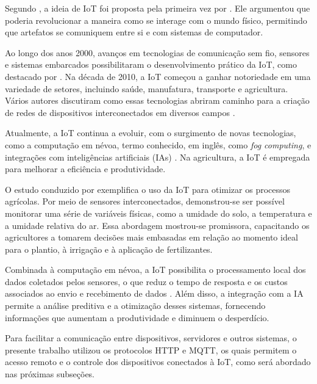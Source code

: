 Segundo \textcite{minerva2015towards}, a ideia de IoT foi proposta pela primeira vez por \textcite{ashton1999things}. Ele argumentou que poderia revolucionar a maneira como se interage com o mundo físico, permitindo que artefatos se comuniquem entre si e com sistemas de computador.

Ao longo dos anos 2000, avanços em tecnologias de comunicação sem fio, sensores e sistemas embarcados possibilitaram o desenvolvimento prático da IoT, como destacado por \textcite{kortuem2009things}. Na década de 2010, a IoT começou a ganhar notoriedade em uma variedade de setores, incluindo saúde, manufatura, transporte e agricultura. Vários autores discutiram como essas tecnologias abriram caminho para a criação de redes de dispositivos interconectados em diversos campos \parencite{kortuem2009things, tan2010things, minerva2015towards}.

Atualmente, a IoT continua a evoluir, com o surgimento de novas tecnologias, como a computação em névoa, termo conhecido, em inglês, como \textit{fog computing}, e integrações com inteligências artificiais (IAs) \parencite{junior2022data}. Na agricultura, a IoT é empregada para melhorar a eficiência e produtividade.

O estudo conduzido por \textcite{ferrandez2018precision} exemplifica o uso da IoT para otimizar os processos agrícolas. Por meio de sensores interconectados, demonstrou-se ser possível monitorar uma série de variáveis físicas, como a umidade do solo, a temperatura e a umidade relativa do ar. Essa abordagem mostrou-se promissora, capacitando os agricultores a tomarem decisões mais embasadas em relação ao momento ideal para o plantio, à irrigação e à aplicação de fertilizantes.

Combinada à computação em névoa, a IoT possibilita o processamento local dos dados coletados pelos sensores, o que reduz o tempo de resposta e os custos associados ao envio e recebimento de dados \parencite{hsu2020creative}. Além disso, a integração com a IA permite a análise preditiva e a otimização desses sistemas, fornecendo informações que aumentam a produtividade e diminuem o desperdício.

Para facilitar a comunicação entre dispositivos, servidores e outros sistemas, o presente trabalho utilizou os protocolos HTTP e MQTT, os quais permitem o acesso remoto e o controle dos dispositivos conectados à IoT, como será abordado nas próximas subseções.

